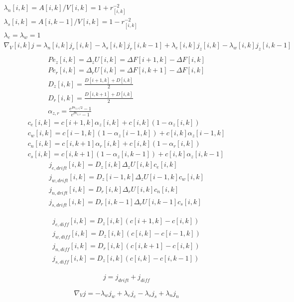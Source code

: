 \documentclass[12pt, a4paper]{article}
\begin{document}
\begin{eqnarray}
    \lambda_{n}[i,k] = A[i,k]/V[i,k] = 1+r_[i,k]^{-2}
    \\
    \lambda_{s}[i,k] = A[i,k-1]/V[i,k] = 1-r_[i,k]^{-2}
    \\
    \lambda_{e} = \lambda_{w} = 1
    \\
    \nabla_V[i, k] j = \lambda_{n}[i,k] j_r[i,k] - \lambda_{s}[i,k] j_r[i,k-1] + \lambda_{e}[i,k] j_z[i,k] - \lambda_{w}[i,k] j_z[i,k-1]
    \\
\end{eqnarray}
\begin{eqnarray}
    Pe_{z}[i,k] = \Delta_{z} U[i,k] = \Delta F[i+1, k] - \Delta F[i, k]
    \\
    Pe_{r}[i,k] = \Delta_{r} U[i,k] = \Delta F[i, k+1] - \Delta F[i, k]
    \\
    D_{z}[i,k] = \frac{D[i+1,k] + D[i,k]}{2}
    \\
    D_{r}[i,k] = \frac{D[i,k+1] + D[i,k]}{2}
    \\
    \alpha_{z,r} = \frac{e^{Pe_{z,r}/2} - 1}{e^{Pe_{z,r}} - 1}
\end{eqnarray}
\begin{eqnarray}
    c_{e}[i,k] = c[i+1,k] \alpha_{z}[i,k] + c[i, k] (1 - \alpha_{z}[i,k])
    \\
    c_{w}[i,k] = c[i-1,k] (1-\alpha_{z}[i-1,k]) + c[i, k] \alpha_{z}[i-1,k]
    \\
    c_{n}[i,k] = c[i,k+1] \alpha_{r}[i,k] + c[i, k] (1 - \alpha_{r}[i,k])
    \\
    c_{s}[i,k] = c[i,k+1] (1-\alpha_{z}[i,k-1]) + c[i, k] \alpha_{z}[i,k-1]
\end{eqnarray}
\begin{eqnarray}
    j_{e, drift}[i,k] = D_z[i,k] \Delta_{z} U[i,k] c_e[i,k]
    \\
    j_{w, drift}[i,k] = D_z[i-1,k] \Delta_{z} U[i-1,k] c_w[i,k]
    \\
    j_{n, drift}[i,k] = D_r[i,k] \Delta_{r} U[i,k] c_n[i,k]
    \\
    j_{s, drift}[i,k] = D_r[i,k-1] \Delta_{r} U[i,k-1] c_s[i,k]
\end{eqnarray}

\begin{eqnarray}
    j_{e, diff}[i,k] = D_z[i,k]  (c[i+1,k] - c[i,k])
    \\
    j_{w, diff}[i,k] = D_z[i,k]  (c[i,k] - c[i-1,k])
    \\
    j_{n, diff}[i,k] = D_r[i,k]  (c[i,k+1] - c[i,k])
    \\
    j_{s, diff}[i,k] = D_z[i,k]  (c[i,k] - c[i,k-1])
\end{eqnarray}

\begin{eqnarray}
    j = j_{drift}+j_{diff}
\end{eqnarray}

\begin{equation}
    \nabla_{V} j = -\lambda_w j_w + \lambda_e j_e - \lambda_s j_s + \lambda_n j_n
\end{equation}
\end{document}
